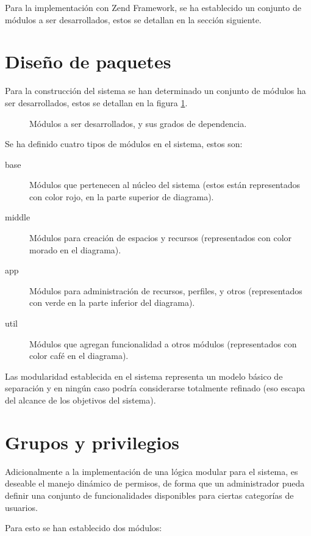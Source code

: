 Para la implementación con Zend Framework, se ha establecido un conjunto de
módulos a ser desarrollados, estos se detallan en la sección siguiente.

\section{Diseño de paquetes}

Para la construcción del sistema se han determinado un conjunto de módulos ha
ser desarrollados, estos se detallan en la figura \ref{paquetes}.

\begin{figure}
\centering

\caption{Módulos a ser desarrollados, y sus grados de dependencia.}
\label{paquetes}
\end{figure}

Se ha definido cuatro tipos de módulos en el sistema, estos son:

\begin{description}
\item [base] Módulos que pertenecen al núcleo del sistema (estos están
representados con color rojo, en la parte superior de diagrama).
\item [middle] Módulos para creación de espacios y recursos (representados con
color morado en el diagrama).
\item [app] Módulos para administración de recursos, perfiles, y otros
(representados con verde en la parte inferior del diagrama).
\item [util] Módulos que agregan funcionalidad a otros módulos (representados
con color café en el diagrama).
\end{description}

Las modularidad establecida en el sistema representa un modelo básico de
separación y en ningún caso podría considerarse totalmente refinado (eso escapa
del alcance de los objetivos del sistema).

\section{Grupos y privilegios}

Adicionalmente a la implementación de una lógica modular para el sistema, es
deseable el manejo dinámico de permisos, de forma que un administrador pueda
definir una conjunto de funcionalidades disponibles para ciertas categorías de
usuarios.

Para esto se han establecido dos módulos:

